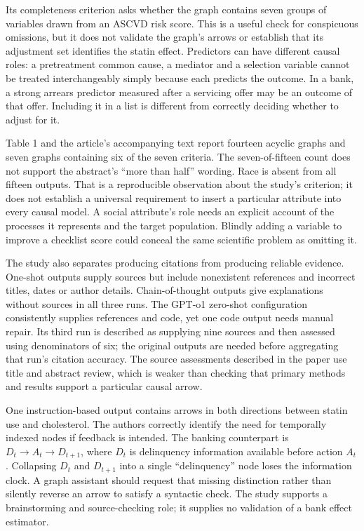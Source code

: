 Its completeness criterion asks whether the graph contains seven groups of
variables drawn from an ASCVD risk score. This is a useful check for conspicuous
omissions, but it does not validate the graph's arrows or establish that its
adjustment set identifies the statin effect. Predictors can have different causal
roles: a pretreatment common cause, a mediator and a selection variable cannot
be treated interchangeably simply because each predicts the outcome. In a bank,
a strong arrears predictor measured after a servicing offer may be an outcome
of that offer. Including it in a list is different from correctly deciding
whether to adjust for it.

Table 1 and the article's accompanying text report fourteen acyclic graphs and
seven graphs containing six of the seven criteria. The seven-of-fifteen count
does not support the abstract's ``more than half'' wording. Race is absent from
all fifteen outputs. That is a reproducible observation about the study's
criterion; it does not establish a universal requirement to insert a particular
attribute into every causal model. A social attribute's role needs an explicit
account of the processes it represents and the target population. Blindly
adding a variable to improve a checklist score could conceal the same scientific
problem as omitting it. \cite{exec22_domain_aziz,exec22_domain_reference}

The study also separates producing citations from producing reliable evidence.
One-shot outputs supply sources but include nonexistent references and incorrect
titles, dates or author details. Chain-of-thought outputs give explanations
without sources in all three runs. The GPT-o1 zero-shot configuration consistently
supplies references and code, yet one code output needs manual repair. Its third
run is described as supplying nine sources and then assessed using denominators
of six; the original outputs are needed before aggregating that run's citation
accuracy. The source assessments described in the paper use title and abstract
review, which is weaker than checking that primary methods and results support
a particular causal arrow. \cite{exec22_domain_aziz}

One instruction-based output contains arrows in both directions between statin
use and cholesterol. The authors correctly identify the need for temporally
indexed nodes if feedback is intended. The banking counterpart is
\(D_t\to A_t\to D_{t+1}\), where \(D_t\) is delinquency information available
before action \(A_t\). Collapsing \(D_t\) and \(D_{t+1}\) into a single
``delinquency'' node loses the information clock. A graph assistant should request
that missing distinction rather than silently reverse an arrow to satisfy a
syntactic check. The study supports a brainstorming and source-checking role;
it supplies no validation of a bank effect estimator.

